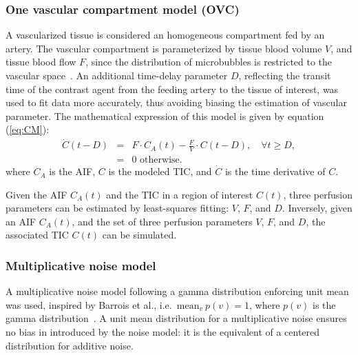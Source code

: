 \subsubsection{One vascular compartment model (OVC)}
\label{sec:OVCModel}
A vascularized tissue is considered an homogeneous compartment fed by an artery.
The vascular compartment is parameterized by tissue blood volume $V$, and tissue blood flow $F$, since the distribution of microbubbles is restricted to the vascular space~\cite{Gunn:2001cx,Doury:2017fz}.
An additional time-delay parameter $D$, reflecting the transit time of the contrast agent from the feeding artery to the tissue of interest, was used to fit data more accurately, thus avoiding biasing the estimation of vascular parameter. 
The mathematical expression of this model is given by equation (\ref{eq:CM}):
\begin{equation}
\begin{array}{rcl}
\dot{C} \left( t - D \right) &=& F \cdot C_A \left( t \right) - \frac{F}{V} \cdot C \left( t - D \right), \quad \forall t \geq D,  \\
 &=& 0 \textrm{ otherwise.}
\end{array}
\label{eq:CM}
\end{equation}
where $C_A$ is the AIF, $C$ is the modeled TIC, and $\dot{C}$ is the time derivative of $C$.

Given the AIF $C_A(t)$ and the TIC in a region of interest $C(t)$, three perfusion parameters can be estimated by least-squares fitting: $V$, $F$, and $D$.
Inversely, given an AIF $C_A(t)$, and the set of three perfusion parameters $V$, $F$, and $D$, the associated TIC $C(t)$ can be simulated.

\subsubsection{Multiplicative noise model}\label{sec:NoiseModel}
A multiplicative noise model following a gamma distribution enforcing unit mean was used, inspired by Barrois et al., i.e.~$\mathrm{mean}_v~p\left(v\right) = 1$, where $p\left(v\right)$ is the gamma distribution~\cite{Barrois:2013gw}.
A unit mean distribution for a multiplicative noise ensures no bias in introduced by the noise model: it is the equivalent of a centered distribution for additive noise.

